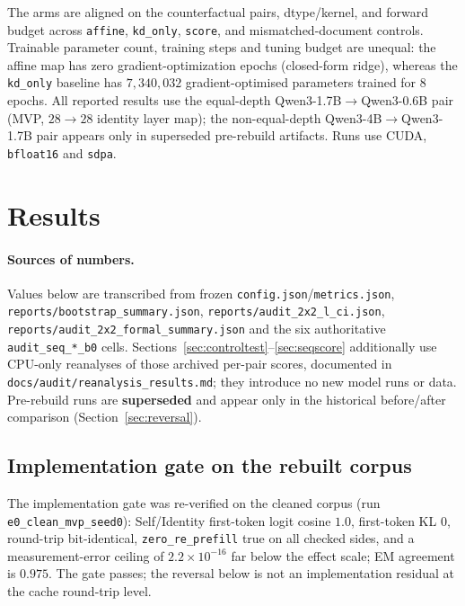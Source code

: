 \documentclass[11pt,twocolumn]{article}
\begin{document}
The arms are aligned on the counterfactual pairs, dtype/kernel, and forward
budget across \texttt{affine}, \texttt{kd\_only}, \texttt{score}, and
mismatched-document controls. Trainable parameter count, training steps and
tuning budget are unequal: the affine map has zero gradient-optimization epochs
(closed-form ridge), whereas the \texttt{kd\_only} baseline has $7{,}340{,}032$
gradient-optimised parameters trained for $8$ epochs. All reported results use
the equal-depth Qwen3-1.7B$\to$Qwen3-0.6B pair (MVP, $28\to28$ identity layer
map); the non-equal-depth Qwen3-4B$\to$Qwen3-1.7B pair appears only in
superseded pre-rebuild artifacts. Runs use CUDA, \texttt{bfloat16} and
\texttt{sdpa}.

\section{Results}
\label{sec:results}

\paragraph{Sources of numbers.} Values below are transcribed from frozen
\texttt{config.json}/\texttt{metrics.json},
\texttt{reports/bootstrap\_summary.json},
\texttt{reports/audit\_2x2\_l\_ci.json},
\texttt{reports/audit\_2x2\_formal\_summary.json} and the six authoritative
\texttt{audit\_seq\_*\_b0} cells. Sections~\ref{sec:controltest}--\ref{sec:seqscore}
additionally use CPU-only reanalyses of those archived per-pair scores,
documented in \texttt{docs/audit/reanalysis\_results.md}; they introduce no new
model runs or data. Pre-rebuild runs are \textbf{superseded} and appear only in
the historical before/after comparison (Section~\ref{sec:reversal}).

\subsection{Implementation gate on the rebuilt corpus}
\label{sec:e0}

The implementation gate was re-verified on the cleaned corpus (run
\texttt{e0\_clean\_mvp\_seed0}): Self/Identity
first-token logit cosine $1.0$, first-token KL $0$, round-trip bit-identical,
\texttt{zero\_re\_prefill} true on all checked sides, and a measurement-error
ceiling of $2.2\times10^{-16}$ far below the effect scale; EM agreement is
$0.975$. The gate passes; the reversal below is not an implementation residual
at the cache round-trip level.
\end{document}
